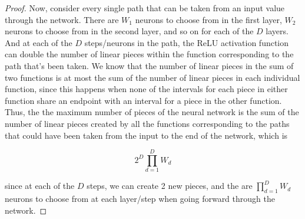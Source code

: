 \begin{solution*}{}{}
\begin{enumerate}
\begin{proof}
Now, consider every single path that can be taken from an input value through
the network. There are $W_{1}$ neurons to choose from in the first layer, $W_2$
neurons to choose from in the second layer, and so on for each of the $D$
layers. And at each of the $D$ steps/neurons in the path, the ReLU activation
function can double the number of linear pieces within the function
corresponding to the path that's been taken. We know that the number of linear
pieces in the sum of two functions is at most the sum of the number of linear
pieces in each individual function, since this happens when none of the
intervals for each piece in either function share an endpoint with an interval
for a piece in the other function. Thus, the the maximum number of pieces of the
neural network is the sum of the number of linear pieces created by all the
functions corresponding to the paths that could have been taken from the input
to the end of the network, which is

\[
2^{D}\prod_{d=1}^{D} W_{d} 
\] 

since at each of the $D$ steps, we can create 2 new pieces, and the are
$\prod_{d=1}^{D} W_{d}$ neurons to choose from at each layer/step when going
forward through the network.
\end{proof}
\end{enumerate}
\end{solution*}

